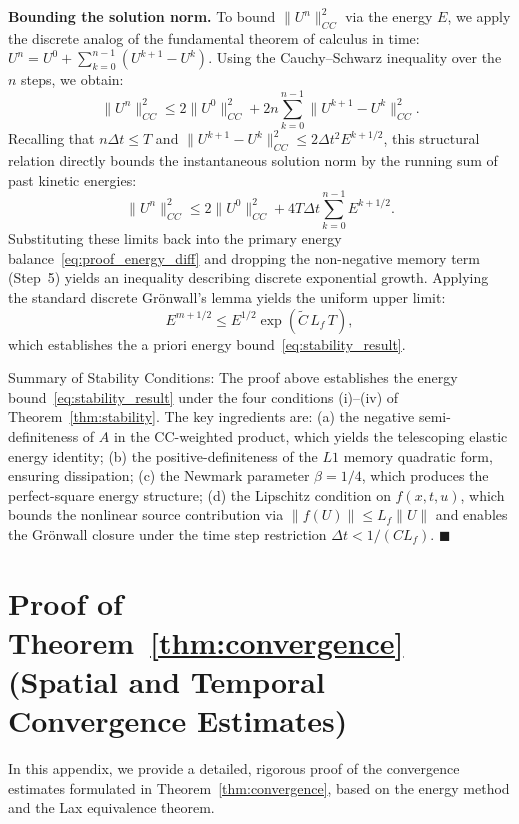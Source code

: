 \documentclass[a4paper,fleqn]{cas-sc}
\begin{document}
\begin{appendix}
\textbf{Bounding the solution norm.} To bound $\|U^n\|_{CC}^2$ via the energy $E$, we apply the discrete analog of the fundamental theorem of calculus in time: $U^n = U^0 + \sum_{k=0}^{n-1} (U^{k+1}-U^k)$. Using the Cauchy--Schwarz inequality over the $n$ steps, we obtain:
\begin{equation}
\|U^n\|_{CC}^2 \le 2\|U^0\|_{CC}^2 + 2n \sum_{k=0}^{n-1} \|U^{k+1}-U^k\|_{CC}^2.
\end{equation}
Recalling that $n\Delta t \le T$ and $\|U^{k+1}-U^k\|_{CC}^2 \le 2\Delta t^2 E^{k+1/2}$, this structural relation directly bounds the instantaneous solution norm by the running sum of past kinetic energies:
\begin{equation}
\|U^n\|_{CC}^2 \le 2\|U^0\|_{CC}^2 + 4 T \Delta t \sum_{k=0}^{n-1} E^{k+1/2}.
\end{equation}
Substituting these limits back into the primary energy balance~\eqref{eq:proof_energy_diff} and dropping the non-negative memory term (Step~5) yields an inequality describing discrete exponential growth. Applying the standard discrete Gr\"onwall's lemma yields the uniform upper limit:
\begin{equation}
E^{m+1/2} \le E^{1/2} \exp(\widetilde{C} \, L_f \, T),
\end{equation}
which establishes the a priori energy bound~\eqref{eq:stability_result}.

Summary of Stability Conditions:
The proof above establishes the energy bound~\eqref{eq:stability_result} under the four conditions (i)--(iv) of Theorem~\ref{thm:stability}. The key ingredients are: (a) the negative semi-definiteness of $A$ in the CC-weighted product, which yields the telescoping elastic energy identity; (b) the positive-definiteness of the $L1$ memory quadratic form, ensuring dissipation; (c) the Newmark parameter $\beta = 1/4$, which produces the perfect-square energy structure; (d) the Lipschitz condition on $f(x,t,u)$, which bounds the nonlinear source contribution via $\|f(U)\| \le L_f \|U\|$ and enables the Gr\"onwall closure under the time step restriction $\Delta t < 1/(CL_f)$.
\hfill $\blacksquare$

\section{Proof of Theorem~\ref{thm:convergence} (Spatial and Temporal Convergence Estimates)}\label{app:proof_theorem2}

In this appendix, we provide a detailed, rigorous proof of the convergence estimates formulated in Theorem~\ref{thm:convergence}, based on the energy method and the Lax equivalence theorem.


\end{appendix}
\end{document}
